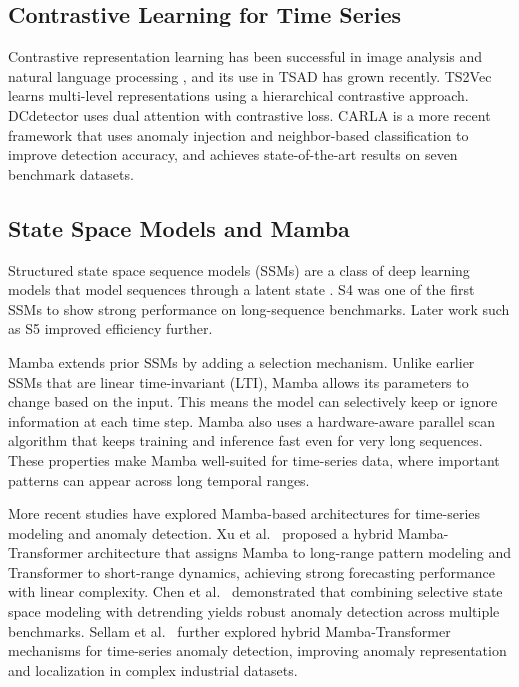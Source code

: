 \documentclass[runningheads]{llncs}
\begin{document}
\subsection{Contrastive Learning for Time Series}

Contrastive representation learning has been successful in image analysis \cite{chen2020simple} and natural language processing \cite{logeswaran2018efficient}, and its use in TSAD has grown recently. TS2Vec \cite{yue2022ts2vec} learns multi-level representations using a hierarchical contrastive approach. DCdetector \cite{yang2023dcdetector} uses dual attention with contrastive loss. CARLA \cite{darban2024carla} is a more recent framework that uses anomaly injection and neighbor-based classification to improve detection accuracy, and achieves state-of-the-art results on seven benchmark datasets.

\subsection{State Space Models and Mamba}

Structured state space sequence models (SSMs) are a class of deep learning models that model sequences through a latent state \cite{gu2022efficiently}. S4 \cite{gu2022efficiently} was one of the first SSMs to show strong performance on long-sequence benchmarks. Later work such as S5 \cite{smith2023simplified} improved efficiency further.

Mamba \cite{gu2023mamba} extends prior SSMs by adding a selection mechanism. Unlike earlier SSMs that are linear time-invariant (LTI), Mamba allows its parameters to change based on the input. This means the model can selectively keep or ignore information at each time step. Mamba also uses a hardware-aware parallel scan algorithm that keeps training and inference fast even for very long sequences. These properties make Mamba well-suited for time-series data, where important patterns can appear across long temporal ranges. 

More recent studies have explored Mamba-based architectures for time-series modeling and anomaly detection. Xu et al.~\cite{xu2024sst} proposed a hybrid Mamba-Transformer architecture that assigns Mamba to long-range pattern modeling and Transformer to short-range dynamics, achieving strong forecasting performance with linear complexity. Chen et al.~\cite{chen2024joint} demonstrated that combining selective state space modeling with detrending yields robust anomaly detection across multiple benchmarks. Sellam et al.~\cite{sellam2025maat} further explored hybrid Mamba-Transformer mechanisms for time-series anomaly detection, improving anomaly representation and localization in complex industrial datasets.
\end{document}
